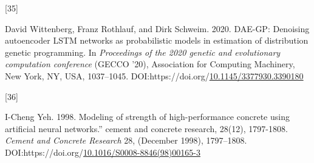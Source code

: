 \documentclass[
  11pt,
]{article}
\newlength{\cslhangindent}
\newlength{\csllabelwidth}
\newlength{\cslentryspacingunit} %
\newenvironment{CSLReferences}[2] %
 {%
  \setlength{\parindent}{0pt}
  \ifodd #1
  \let\oldpar\par
  \def\par{\hangindent=\cslhangindent\oldpar}
  \fi
  \setlength{\parskip}{#2\cslentryspacingunit}
 }%
 {}
\newcommand{\CSLLeftMargin}[1]{\parbox[t]{\csllabelwidth}{#1}}
\newcommand{\CSLRightInline}[1]{\parbox[t]{\linewidth - \csllabelwidth}{#1}\break}
\begin{document}
\begin{CSLReferences}{0}{0}
\leavevmode{}%
\CSLLeftMargin{{[}35{]} }%
\CSLRightInline{David Wittenberg, Franz Rothlauf, and Dirk Schweim. 2020. DAE-GP: Denoising autoencoder LSTM networks as probabilistic models in estimation of distribution genetic programming. In \emph{Proceedings of the 2020 genetic and evolutionary computation conference} (GECCO '20), Association for Computing Machinery, New York, NY, USA, 1037--1045. DOI:https://doi.org/\href{https://doi.org/10.1145/3377930.3390180}{10.1145/3377930.3390180}}

\leavevmode{}%
\CSLLeftMargin{{[}36{]} }%
\CSLRightInline{I-Cheng Yeh. 1998. Modeling of strength of high-performance concrete using artificial neural networks.'' cement and concrete research, 28(12), 1797-1808. \emph{Cement and Concrete Research} 28, (December 1998), 1797--1808. DOI:https://doi.org/\href{https://doi.org/10.1016/S0008-8846(98)00165-3}{10.1016/S0008-8846(98)00165-3}}

\end{CSLReferences}
\end{document}
